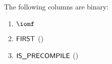 The following columns are binary:
\begin{multicols}{3}
\begin{enumerate}
	\item $\iomf$
	\item $\textsf{FIRST}$        \quad (\trash)
	\item $\textsf{IS\_PRECOMPILE}$ \quad (\trash)
\end{enumerate}
\end{multicols}
